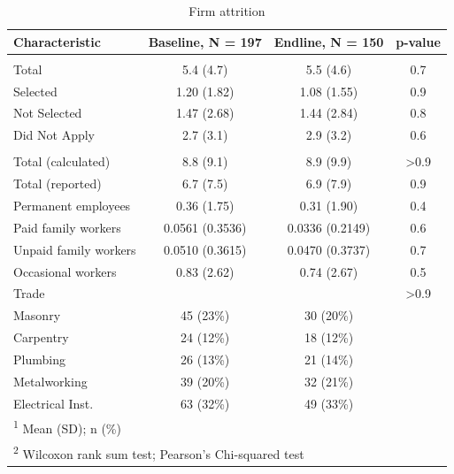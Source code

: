 \documentclass[
  11pt,
a4paper
]{article}
\begin{document}
\begin{table}[H]

\caption{\label{tab:tbl-attritionfirms}Firm attrition}
\centering
\begin{tabular}[t]{lccc}
\toprule
\textbf{Characteristic} & \textbf{Baseline}, N = 197 & \textbf{Endline}, N = 150 & \textbf{p-value}\\
\midrule
\addlinespace[0.3em]
\multicolumn{4}{l}{Apprentices trained}\\
\hspace{1em}Total & 5.4 (4.7) & 5.5 (4.6) & 0.7\\
\hspace{1em}Selected & 1.20 (1.82) & 1.08 (1.55) & 0.9\\
\hspace{1em}Not Selected & 1.47 (2.68) & 1.44 (2.84) & 0.8\\
\hspace{1em}Did Not Apply & 2.7 (3.1) & 2.9 (3.2) & 0.6\\
\addlinespace[0.3em]
\multicolumn{4}{l}{Firm size}\\
\hspace{1em}Total (calculated) & 8.8 (9.1) & 8.9 (9.9) & >0.9\\
\hspace{1em}Total (reported) & 6.7 (7.5) & 6.9 (7.9) & 0.9\\
\hspace{1em}Permanent employees & 0.36 (1.75) & 0.31 (1.90) & 0.4\\
\hspace{1em}Paid family workers & 0.0561 (0.3536) & 0.0336 (0.2149) & 0.6\\
\hspace{1em}Unpaid family workers & 0.0510 (0.3615) & 0.0470 (0.3737) & 0.7\\
\hspace{1em}Occasional workers & 0.83 (2.62) & 0.74 (2.67) & 0.5\\
Trade &  &  & >0.9\\
\hspace{1em}Masonry & 45 (23\%) & 30 (20\%) & \\
\hspace{1em}Carpentry & 24 (12\%) & 18 (12\%) & \\
\hspace{1em}Plumbing & 26 (13\%) & 21 (14\%) & \\
\hspace{1em}Metalworking & 39 (20\%) & 32 (21\%) & \\
\hspace{1em}Electrical Inst. & 63 (32\%) & 49 (33\%) & \\
\bottomrule
\multicolumn{4}{l}{\rule{0pt}{1em}\textsuperscript{1} Mean (SD); n (\%)}\\
\multicolumn{4}{l}{\rule{0pt}{1em}\textsuperscript{2} Wilcoxon rank sum test; Pearson's Chi-squared test}\\
\end{tabular}
\end{table}
\end{document}
